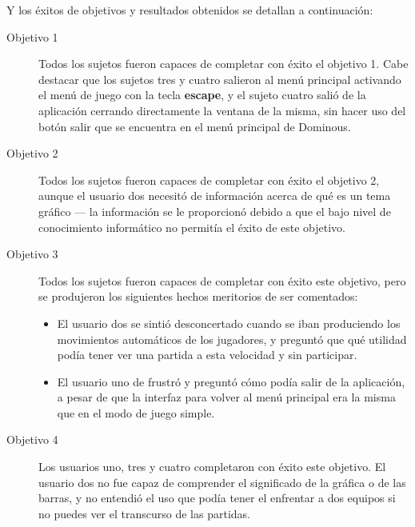 Y los éxitos de objetivos y resultados obtenidos se detallan a continuación:

\begin{description}
    \item[Objetivo 1] Todos los sujetos fueron capaces de completar con éxito el objetivo 1. Cabe destacar que los sujetos
            tres y cuatro salieron al menú principal activando el menú de juego con la tecla \textbf{escape}, y el
            sujeto cuatro salió de la aplicación cerrando directamente la ventana de la misma, sin hacer uso del
            botón salir que se encuentra en el menú principal de Dominous.
    \item[Objetivo 2] Todos los sujetos fueron capaces de completar con éxito el objetivo 2, aunque el usuario dos
            necesitó de información acerca de qué es un tema gráfico --- la información se le proporcionó debido a que el
            bajo nivel de conocimiento informático no permitía el éxito de este objetivo.
    \item[Objetivo 3] Todos los sujetos fueron capaces de completar con éxito este objetivo, pero se produjeron los
            siguientes hechos meritorios de ser comentados:
            \begin{itemize}
                \item El usuario dos se sintió desconcertado cuando se iban produciendo los movimientos automáticos
                    de los jugadores, y preguntó que qué utilidad podía tener ver una partida a esta velocidad y sin
                    participar.
                \item El usuario uno de frustró y preguntó cómo podía salir de la aplicación, a pesar de que la interfaz
                    para volver al menú principal era la misma que en el modo de juego simple.
            \end{itemize}
    \item[Objetivo 4] Los usuarios uno, tres y cuatro completaron con éxito este objetivo. El usuario dos no fue
            capaz de comprender el significado de la gráfica o de las barras, y no entendió el uso que podía tener el
            enfrentar a dos equipos si no puedes ver el transcurso de las partidas.
\end{description}
